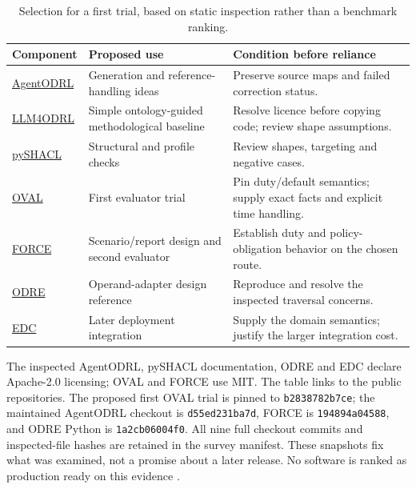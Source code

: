 \begin{table}[htbp]
\centering
\caption{Selection for a first trial, based on static inspection rather than a benchmark ranking.}
\label{tab:odrl-software-choices}
\begingroup
\footnotesize
\renewcommand{\arraystretch}{1.08}
\begin{tabularx}{\textwidth}{P{27mm}YY}
\toprule
Component & Proposed use & Condition before reliance\\
\midrule
\href{https://github.com/keman-ruc/wanle-Agentodrl}{AgentODRL} & Generation and reference-handling ideas & Preserve source maps and failed correction status.\\
\href{https://github.com/Daham-Mustaf/LLM4ODRL}{LLM4ODRL} & Simple ontology-guided methodological baseline & Resolve licence before copying code; review shape assumptions.\\
\href{https://github.com/RDFLib/pySHACL}{pySHACL} & Structural and profile checks & Review shapes, targeting and negative cases.\\
\href{https://github.com/DIPS-Tools/ODRL-Engine}{OVAL} & First evaluator trial & Pin duty/default semantics; supply exact facts and explicit time handling.\\
\href{https://github.com/odrl-force/ODRL-Evaluator}{FORCE} & Scenario/report design and second evaluator & Establish duty and policy-obligation behavior on the chosen route.\\
\href{https://github.com/ODRE-Framework/odre-python}{ODRE} & Operand-adapter design reference & Reproduce and resolve the inspected traversal concerns.\\
\href{https://github.com/eclipse-edc/Connector}{EDC} & Later deployment integration & Supply the domain semantics; justify the larger integration cost.\\
\bottomrule
\end{tabularx}
\endgroup
\end{table}

The inspected AgentODRL, pySHACL documentation, ODRE and EDC declare Apache-2.0
licensing; OVAL and FORCE use MIT. The table links to the public repositories.
The proposed first OVAL trial is pinned to \texttt{b2838782b7ce}; the maintained
AgentODRL checkout is \texttt{d55ed231ba7d}, FORCE is \texttt{194894a04588},
and ODRE Python is \texttt{1a2cb06004f0}. All nine full checkout commits and inspected-file
hashes are retained in the survey manifest. These snapshots fix what was
examined, not a promise about a later release. No software is ranked as
production ready on this evidence \citep{hkmaodrlsoftware2026}.

